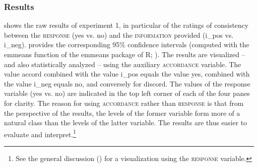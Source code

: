 \documentclass[output=paper,colorlinks,citecolor=brown]{langscibook}
\begin{document}



\subsubsection{Results} \label{hrdsim:sec:results-e1}

 shows the raw results of experiment 1, in particular of the ratings of consistency between the \textsc{response} (\textsf{yes} vs. \textsf{no}) and the \textsc{information} provided (\textsf{i\_pos} vs. \textsf{i\_neg}).  provides the corresponding 95\% confidence intervals (computed with the emmeans function of the emmeans package of R; \citealt{Lenth2024}). The results are visualized -- and also statistically analyzed -- using the auxiliary \textsc{accordance} variable. The value \textsf{accord} combined with the value \textsf{i\_pos} equals the value \textsf{yes}, combined with the value \textsf{i\_neg} equals \textsf{no}, and conversely for \textsf{discord}. The values of the \textsf{response} variable (\textsf{yes} vs. \textsf{no}) are indicated in the top left corner of each of the four panes for clarity. The reason for using \textsc{accordance} rather than \textsc{response} is that from the perspective of the results, the levels of the former variable form more of a natural class than the levels of the latter variable. The results are thus easier to evaluate and interpret.\footnote{See the general discussion () for a visualization using the \textsc{response} variable.}
\end{document}
